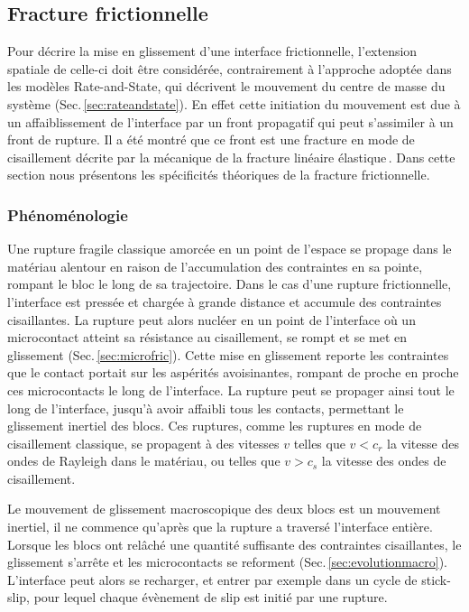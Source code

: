 \subsection{Fracture frictionnelle}
\label{sec:LEFMfric}



Pour décrire la mise en glissement d'une interface frictionnelle,
l'extension spatiale de celle-ci doit être considérée, contrairement à l'approche adoptée dans les modèles Rate-and-State, qui décrivent le mouvement du centre de masse du système
(Sec.\,\ref{sec:rateandstate}). En effet cette initiation du mouvement est due à un affaiblissement de l'interface par un front propagatif qui peut s'assimiler à un front de rupture. Il a été montré que ce front est une fracture en mode de cisaillement décrite par la mécanique de la fracture linéaire élastique\,\cite{svetlizky_brittle_2019}. Dans cette section nous présentons les spécificités théoriques de la fracture frictionnelle.


\subsubsection{Phénoménologie}

Une rupture fragile classique amorcée en un point de l'espace se propage dans le matériau alentour en raison de l'accumulation des contraintes en sa pointe, rompant le bloc le long de sa trajectoire. Dans le cas d'une rupture frictionnelle, l'interface est pressée et chargée à grande distance et accumule des contraintes cisaillantes. La rupture peut alors nucléer en un point de l'interface où un microcontact atteint sa résistance au cisaillement, se rompt et se met en glissement (Sec.\,\ref{sec:microfric}). Cette mise en glissement reporte les contraintes que le contact portait sur les aspérités avoisinantes, rompant de proche en proche ces microcontacts le long de l'interface. La rupture peut se propager ainsi tout le long de l'interface, jusqu'à avoir affaibli tous les contacts, permettant le glissement inertiel des blocs. Ces ruptures, comme les ruptures en mode de cisaillement classique, se propagent à des vitesses $v$ telles que $v<c_r$ la vitesse des ondes de Rayleigh dans le matériau, ou telles que $v>c_s$ la vitesse des ondes de cisaillement.

Le mouvement de glissement macroscopique des deux blocs est un mouvement inertiel, il ne commence qu'après que la rupture a traversé l'interface entière. Lorsque les blocs ont relâché une quantité suffisante des contraintes cisaillantes, le glissement s'arrête et les microcontacts se reforment (Sec.\,\ref{sec:evolutionmacro}). L'interface peut alors se recharger, et entrer par exemple dans un cycle de stick-slip, pour lequel chaque évènement de slip est initié par une rupture.

